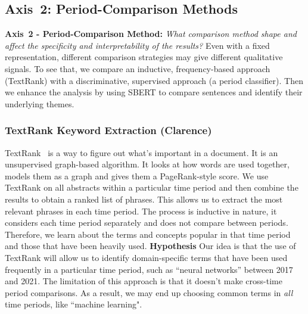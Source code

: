 \documentclass[11pt]{article}
\begin{document}
\subsection{Axis~2: Period-Comparison Methods}
\textbf{Axis~2 - Period-Comparison Method:} \textit{What comparison method shape and affect the specificity and interpretability of the results?}
Even with a fixed representation, different comparison strategies may give different qualitative signals. To see that, we compare an inductive, frequency-based approach (TextRank) with a discriminative, supervised approach (a period classifier). Then we enhance the analysis by using SBERT to compare sentences and identify their underlying themes.

\subsubsection{TextRank Keyword Extraction (Clarence)}
TextRank~\cite{mihalcea-tarau-2004-textrank} is a way to figure out what's important in a document. It is an unsupervised graph-based algorithm. It looks at how words are used together, models them as a graph and gives them a PageRank-style score. We use TextRank on all abstracts within a particular time period and then combine the results to obtain a ranked list of phrases. This allows us to extract the most relevant phrases in each time period. The process is inductive in nature, it considers each time period separately and does not compare between periods. Therefore, we learn about the terms and concepts popular in that time period and those that have been heavily used.
\textbf{Hypothesis} Our idea is that the use of TextRank will allow us to identify domain-specific terms that have been used frequently in a particular time period, such as “neural networks” between 2017 and 2021. The limitation of this approach is that it doesn’t make cross-time period comparisons. As a result, we may end up choosing common terms in \emph{all} time periods, like “machine learning".
\end{document}
